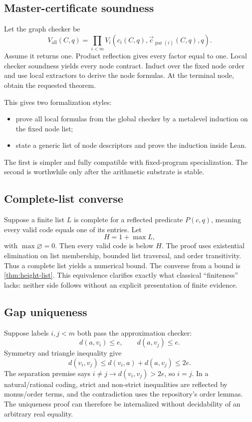 \subsection{Master-certificate soundness}

Let the graph checker be
\[
 V_{\mathrm{all}}(C,q)
 =\prod_{i<m}V_i(c_i(C,q),\vec c_{\operatorname{par}(i)}(C,q),q).
\]
Assume it returns one.  Product reflection gives every factor equal to one.
Local checker soundness yields every node contract.  Induct over the fixed node
order and use local extractors to derive the node formulas.  At the terminal
node, obtain the requested theorem.

This gives two formalization styles:

\begin{itemize}
\item prove all local formulas from the global checker by a metalevel induction
on the fixed node list;
\item state a generic list of node descriptors and prove the induction inside
Lean.
\end{itemize}

The first is simpler and fully compatible with fixed-program specialization.
The second is worthwhile only after the arithmetic substrate is stable.

\subsection{Complete-list converse}

Suppose a finite list \(L\) is complete for a reflected predicate \(P(c,q)\),
meaning every valid code equals one of its entries.  Let
\[
 H=1+\max L,
\]
with \(\max\varnothing=0\).  Then every valid code is below \(H\).  The proof
uses existential elimination on list membership, bounded list traversal, and
order transitivity.  Thus a complete list yields a numerical bound.  The
converse from a bound is \cref{thm:height-list}.  This equivalence clarifies
exactly what classical ``finiteness'' lacks: neither side follows without an
explicit presentation of finite evidence.

\subsection{Gap uniqueness}

Suppose labels \(i,j<m\) both pass the approximation checker:
\[
 d(a,v_i)\le e,
 \qquad
 d(a,v_j)\le e.
\]
Symmetry and triangle inequality give
\[
 d(v_i,v_j)\le d(v_i,a)+d(a,v_j)\le2e.
\]
The separation premise says \(i\ne j\to d(v_i,v_j)>2e\), so \(i=j\).  In a
natural/rational coding, strict and non-strict inequalities are reflected by
monus/order terms, and the contradiction uses the repository's order lemmas.
The uniqueness proof can therefore be internalized without decidability of an
arbitrary real equality.
